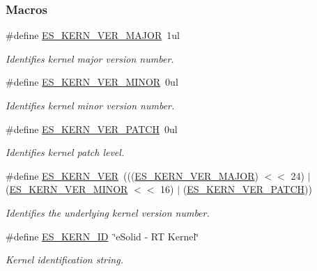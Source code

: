 \subsubsection*{Macros}
\begin{DoxyCompactItemize}
\item 
\#define \hyperlink{group__kern__id_ga06861cd0f6159ea9578193418c4eedf3}{E\-S\-\_\-\-K\-E\-R\-N\-\_\-\-V\-E\-R\-\_\-\-M\-A\-J\-O\-R}~1ul
\begin{DoxyCompactList}\small\item\em Identifies kernel major version number. \end{DoxyCompactList}\item 
\#define \hyperlink{group__kern__id_gaba74930b21c9c629a2589437f1e2584c}{E\-S\-\_\-\-K\-E\-R\-N\-\_\-\-V\-E\-R\-\_\-\-M\-I\-N\-O\-R}~0ul
\begin{DoxyCompactList}\small\item\em Identifies kernel minor version number. \end{DoxyCompactList}\item 
\#define \hyperlink{group__kern__id_gaa04466b958eeef9d02afadd6481abe5f}{E\-S\-\_\-\-K\-E\-R\-N\-\_\-\-V\-E\-R\-\_\-\-P\-A\-T\-C\-H}~0ul
\begin{DoxyCompactList}\small\item\em Identifies kernel patch level. \end{DoxyCompactList}\item 
\#define \hyperlink{group__kern__id_gacde22f7336a3c1c032dfc0ee3b94f506}{E\-S\-\_\-\-K\-E\-R\-N\-\_\-\-V\-E\-R}~(((\hyperlink{group__kern__id_ga06861cd0f6159ea9578193418c4eedf3}{E\-S\-\_\-\-K\-E\-R\-N\-\_\-\-V\-E\-R\-\_\-\-M\-A\-J\-O\-R}) $<$$<$ 24) $|$ (\hyperlink{group__kern__id_gaba74930b21c9c629a2589437f1e2584c}{E\-S\-\_\-\-K\-E\-R\-N\-\_\-\-V\-E\-R\-\_\-\-M\-I\-N\-O\-R} $<$$<$ 16) $|$ (\hyperlink{group__kern__id_gaa04466b958eeef9d02afadd6481abe5f}{E\-S\-\_\-\-K\-E\-R\-N\-\_\-\-V\-E\-R\-\_\-\-P\-A\-T\-C\-H}))
\begin{DoxyCompactList}\small\item\em Identifies the underlying kernel version number. \end{DoxyCompactList}\item 
\#define \hyperlink{group__kern__id_ga7a9484c6b09349e4eb82ba67c0989e25}{E\-S\-\_\-\-K\-E\-R\-N\-\_\-\-I\-D}~\char`\"{}e\-Solid -\/ R\-T Kernel\char`\"{}
\begin{DoxyCompactList}\small\item\em Kernel identification string. \end{DoxyCompactList}\end{DoxyCompactItemize}


